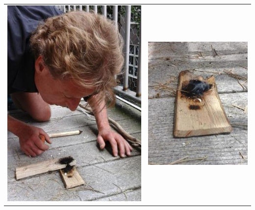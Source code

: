 \documentclass[a4paper, handout]{beamer}
\begin{document}
\begin{frame}
\begin{tabular}{ c c }
		\includegraphics[scale=0.22]{boren-3}
		&
		\includegraphics[scale=0.35]{boren-4}
		\\
	\end{tabular}
\end{frame}
\end{document}

